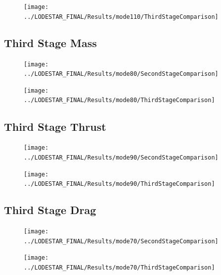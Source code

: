 \begin{figure}[th]
\centering
\texttt{[image: ../LODESTAR\_FINAL/Results/mode110/ThirdStageComparison]}
\caption{}
\label{fig:ThirdStageComparison5}
\end{figure}
\FloatBarrier
\subsection{Third Stage Mass}

\begin{figure}[th]
\centering
\texttt{[image: ../LODESTAR\_FINAL/Results/mode80/SecondStageComparison]}
\caption{}
\label{fig:SecondStageComparison6}
\end{figure}


\begin{figure}[th]
\centering
\texttt{[image: ../LODESTAR\_FINAL/Results/mode80/ThirdStageComparison]}
\caption{}
\label{fig:ThirdStageComparison6}
\end{figure}

\FloatBarrier
\subsection{Third Stage Thrust}

\begin{figure}[th]
	\centering
	\texttt{[image: ../LODESTAR\_FINAL/Results/mode90/SecondStageComparison]}
	\caption{}
	\label{fig:SecondStageComparison7}
\end{figure}

\begin{figure}[th]
\centering
\texttt{[image: ../LODESTAR\_FINAL/Results/mode90/ThirdStageComparison]}
\caption{}
\label{fig:ThirdStageComparison7}
\end{figure}
\FloatBarrier
\subsection{Third Stage Drag}

\begin{figure}[th]
\centering
\texttt{[image: ../LODESTAR\_FINAL/Results/mode70/SecondStageComparison]}
\caption{}
\label{fig:SecondStageComparison8}
\end{figure}


\begin{figure}[th]
\centering
\texttt{[image: ../LODESTAR\_FINAL/Results/mode70/ThirdStageComparison]}
\caption{}
\label{fig:ThirdStageComparison8}
\end{figure}


